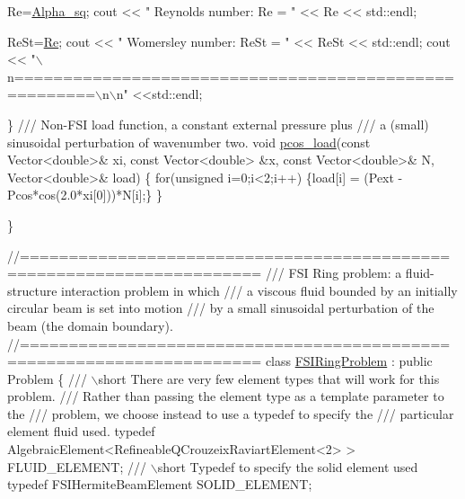 \begin{DoxyCodeInclude}
  Re=\hyperlink{namespaceGlobal__Physical__Variables_a056817f9a80034eff75fcf94c44b08cd}{Alpha\_sq};
  cout << \textcolor{stringliteral}{"            Reynolds number:                  Re = "} 
       << Re << std::endl;

  ReSt=\hyperlink{namespaceGlobal__Physical__Variables_ab814e627d2eb5bc50318879d19ab16b9}{Re};
  cout << \textcolor{stringliteral}{"           Womersley number:                ReSt = "} 
       << ReSt << std::endl;
  cout << \textcolor{stringliteral}{"\(\backslash\)n======================================================\(\backslash\)n\(\backslash\)n"} 
       <<std::endl;

 \}
\textcolor{comment}{}
\textcolor{comment}{ /// Non-FSI load function, a constant external pressure plus}
\textcolor{comment}{ /// a (small) sinusoidal perturbation of wavenumber two.}
\textcolor{comment}{} \textcolor{keywordtype}{void} \hyperlink{namespaceGlobal__Physical__Variables_aa08c246eac99f59be33ef4a6ee924990}{pcos\_load}(\textcolor{keyword}{const} Vector<double>& xi, \textcolor{keyword}{const} Vector<double> &x,
                \textcolor{keyword}{const} Vector<double>& N, Vector<double>& load)
 \{
  \textcolor{keywordflow}{for}(\textcolor{keywordtype}{unsigned} i=0;i<2;i++) 
   \{load[i] = (Pext - Pcos*cos(2.0*xi[0]))*N[i];\}
 \}

\}


\textcolor{comment}{//======================================================================}\textcolor{comment}{}
\textcolor{comment}{/// FSI Ring problem: a fluid-structure interaction problem in which}
\textcolor{comment}{/// a viscous fluid bounded by an initially circular beam is set into motion}
\textcolor{comment}{/// by a small sinusoidal perturbation of the beam (the domain boundary).}
\textcolor{comment}{}\textcolor{comment}{//======================================================================}
\textcolor{keyword}{class }\hyperlink{classFSIRingProblem}{FSIRingProblem} : \textcolor{keyword}{public} Problem
\{\textcolor{comment}{}
\textcolor{comment}{ /// \(\backslash\)short There are very few element types that will work for this problem.}
\textcolor{comment}{ /// Rather than passing the element type as a template parameter to the}
\textcolor{comment}{ /// problem, we choose instead to use a typedef to specify the}
\textcolor{comment}{ /// particular element fluid used.}
\textcolor{comment}{} \textcolor{keyword}{typedef} AlgebraicElement<RefineableQCrouzeixRaviartElement<2> > FLUID\_ELEMENT;
\textcolor{comment}{}
\textcolor{comment}{ /// \(\backslash\)short Typedef to specify the solid element used}
\textcolor{comment}{} \textcolor{keyword}{typedef} FSIHermiteBeamElement SOLID\_ELEMENT;


\end{DoxyCodeInclude}
